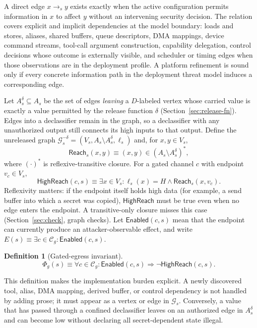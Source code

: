 \documentclass[11pt,letterpaper]{article}
\theoremstyle{plain}
\theoremstyle{definition}
\newtheorem{definition}{Definition}
\newcommand{\HR}{\mathsf{HighReach}}
\newcommand{\Reach}{\mathsf{Reach}}
\newcommand{\En}{\mathsf{Enabled}}
\newcommand{\Cg}{\mathcal{C}_g}
\newcommand{\Gs}{\mathcal{G}}
\begin{document}
A direct edge $x \to_s y$ exists exactly when the active configuration permits information in $x$ to affect $y$ without an intervening security decision. The relation covers explicit and implicit dependencies at the model boundary: loads and stores, aliases, shared buffers, queue descriptors, DMA mappings, device command streams, tool-call argument construction, capability delegation, control decisions whose outcome is externally visible, and scheduler or timing edges when those observations are in the deployment profile. A platform refinement is sound only if every concrete information path in the deployment threat model induces a corresponding edge.

Let $A^{\delta}_s \subseteq A_s$ be the set of edges \emph{leaving} a $D$-labeled vertex whose carried value is exactly a value permitted by the release function $\delta$ (Section~\ref{sec:release-fn}). Edges into a declassifier remain in the graph, so a declassifier with any unauthorized output still connects its high inputs to that output. Define the unreleased graph $\Gs^{-\delta}_s = (V_s, A_s \setminus A^{\delta}_s, \ell_s)$ and, for $x, y \in V_s$,
\begin{equation}\label{eq:reach}
\Reach_s(x,y) \equiv (x,y) \in (A_s \setminus A^{\delta}_s)^{*},
\end{equation}
where $(\cdot)^{*}$ is reflexive-transitive closure. For a gated channel $c$ with endpoint $v_c \in V_s$,
\begin{equation}\label{eq:highreach}
\HR(c,s) \equiv \exists x \in V_s : \ell_s(x) = H \wedge \Reach_s(x, v_c).
\end{equation}
Reflexivity matters: if the endpoint itself holds high data (for example, a send buffer into which a secret was copied), $\HR$ must be true even when no edge enters the endpoint. A transitive-only closure misses this case (Section~\ref{sec:check}, graph checks). Let $\En(c,s)$ mean that the endpoint can currently produce an attacker-observable effect, and write $E(s) \equiv \exists c \in \Cg : \En(c,s)$.

\begin{definition}[Gated-egress invariant]\label{def:phig}
\[
\boxed{\;\Phi_g(s) \equiv \forall c \in \Cg : \En(c,s) \Rightarrow \neg\HR(c,s).\;}
\]
\end{definition}

This definition makes the implementation burden explicit. A newly discovered tool, alias, DMA mapping, derived buffer, or control dependency is not handled by adding prose; it must appear as a vertex or edge in $\Gs_s$. Conversely, a value that has passed through a confined declassifier leaves on an authorized edge in $A^{\delta}_s$ and can become low without declaring all secret-dependent state illegal.
\end{document}
